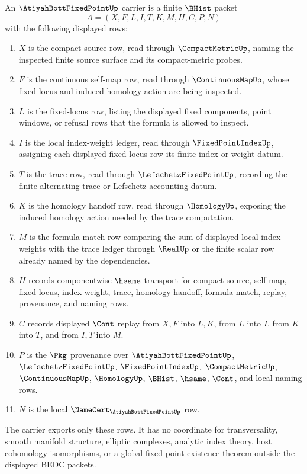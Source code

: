\begin{definition}
\label{def:atiyah-bott-fixed-point-carrier}
An $\AtiyahBottFixedPointUp$ carrier is a finite $\BHist$ packet
$$
A=(X,F,L,I,T,K,M,H,C,P,N)
$$
with the following displayed rows:
\begin{enumerate}
\item $X$ is the compact-source row, read through $\CompactMetricUp$, naming the inspected finite source surface and its compact-metric probes.
\item $F$ is the continuous self-map row, read through $\ContinuousMapUp$, whose fixed-locus and induced homology action are being inspected.
\item $L$ is the fixed-locus row, listing the displayed fixed components, point windows, or refusal rows that the formula is allowed to inspect.
\item $I$ is the local index-weight ledger, read through $\FixedPointIndexUp$, assigning each displayed fixed-locus row its finite index or weight datum.
\item $T$ is the trace row, read through $\LefschetzFixedPointUp$, recording the finite alternating trace or Lefschetz accounting datum.
\item $K$ is the homology handoff row, read through $\HomologyUp$, exposing the induced homology action needed by the trace computation.
\item $M$ is the formula-match row comparing the sum of displayed local index-weights with the trace ledger through $\RealUp$ or the finite scalar row already named by the dependencies.
\item $H$ records componentwise $\hsame$ transport for compact source, self-map, fixed-locus, index-weight, trace, homology handoff, formula-match, replay, provenance, and naming rows.
\item $C$ records displayed $\Cont$ replay from $X,F$ into $L,K$, from $L$ into $I$, from $K$ into $T$, and from $I,T$ into $M$.
\item $P$ is the $\Pkg$ provenance over $\AtiyahBottFixedPointUp$, $\LefschetzFixedPointUp$, $\FixedPointIndexUp$, $\CompactMetricUp$, $\ContinuousMapUp$, $\HomologyUp$, $\BHist$, $\hsame$, $\Cont$, and local naming rows.
\item $N$ is the local $\NameCert_{\AtiyahBottFixedPointUp}$ row.
\end{enumerate}
The carrier exports only these rows. It has no coordinate for transversality, smooth manifold structure, elliptic complexes, analytic index theory, host cohomology isomorphisms, or a global fixed-point existence theorem outside the displayed BEDC packets.
\end{definition}

